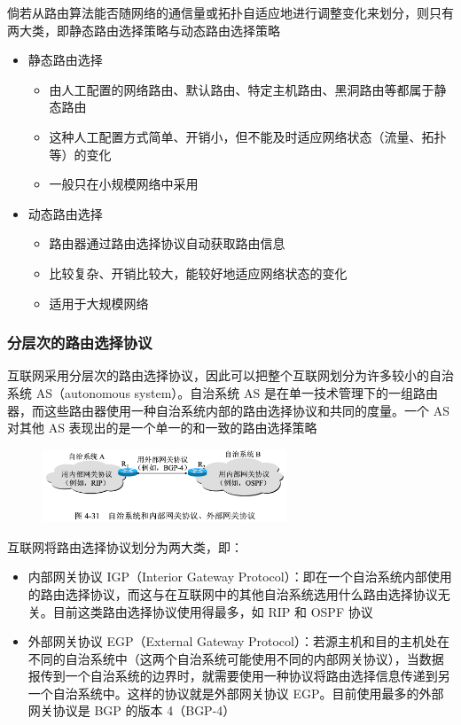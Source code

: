 \documentclass[cs4size,a4paper,10pt]{ctexart}
\begin{document}
	倘若从路由算法能否随网络的通信量或拓扑自适应地进行调整变化来划分，则只有两大类，即静态路由选择策略与动态路由选择策略
	\begin{itemize}
		\item 静态路由选择
		\begin{itemize}
			\item 由人工配置的网络路由、默认路由、特定主机路由、黑洞路由等都属于静态路由
			\item 这种人工配置方式简单、开销小，但不能及时适应网络状态（流量、拓扑等）的变化
			\item 一般只在小规模网络中采用
		\end{itemize}
		\item 动态路由选择
		\begin{itemize}
			\item 路由器通过路由选择协议自动获取路由信息
			\item 比较复杂、开销比较大，能较好地适应网络状态的变化
			\item 适用于大规模网络
		\end{itemize}
	\end{itemize}

	\subsubsection{分层次的路由选择协议}
	互联网采用分层次的路由选择协议，因此可以把整个互联网划分为许多较小的自治系统 AS（autonomous system）。自治系统 AS 是在单一技术管理下的一组路由器，而这些路由器使用一种自治系统内部的路由选择协议和共同的度量。一个 AS 对其他 AS 表现出的是一个单一的和一致的路由选择策略
	\begin{figure}[H]
		\centering
		\includegraphics[width=0.65\textwidth]{img/4.31}
	\end{figure}

	互联网将路由选择协议划分为两大类，即：
	\begin{itemize}
		\item 内部网关协议 IGP（Interior Gateway Protocol）：即在一个自治系统内部使用的路由选择协议，而这与在互联网中的其他自治系统选用什么路由选择协议无关。目前这类路由选择协议使用得最多，如 RIP 和 OSPF 协议
		\item 外部网关协议 EGP（External Gateway Protocol）：若源主机和目的主机处在不同的自治系统中（这两个自治系统可能使用不同的内部网关协议），当数据报传到一个自治系统的边界时，就需要使用一种协议将路由选择信息传递到另一个自治系统中。这样的协议就是外部网关协议 EGP。目前使用最多的外部网关协议是 BGP 的版本 4（BGP-4）
	\end{itemize}
\end{document}
